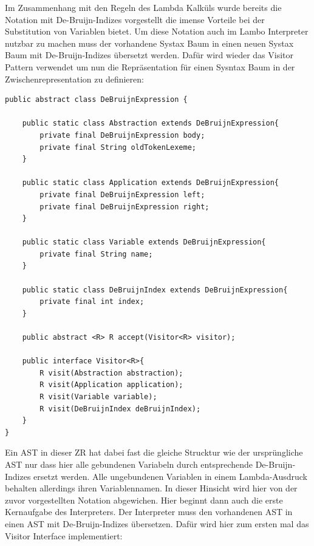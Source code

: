 \documentclass[ngerman]{article}
\begin{document}
Im Zusammenhang mit den Regeln des Lambda Kalküls wurde bereits die Notation mit De-Bruijn-Indizes vorgestellt die imense Vorteile bei der Substitution von Variablen bietet. Um diese Notation auch im Lambo Interpreter nutzbar zu machen muss der vorhandene Systax Baum in einen neuen Systax Baum mit De-Bruijn-Indizes übersetzt werden. Dafür wird wieder das Visitor Pattern verwendet um nun die Repräsentation für einen Sysntax Baum in der Zwischenrepresentation zu definieren:
\begin{lstlisting}[caption={TODO: Referenz zu Anhang}, captionpos=b]
public abstract class DeBruijnExpression {

    public static class Abstraction extends DeBruijnExpression{
        private final DeBruijnExpression body;
        private final String oldTokenLexeme;
    }

    public static class Application extends DeBruijnExpression{
        private final DeBruijnExpression left;
        private final DeBruijnExpression right;
    }

    public static class Variable extends DeBruijnExpression{
        private final String name;
    }

    public static class DeBruijnIndex extends DeBruijnExpression{
        private final int index;
    }

    public abstract <R> R accept(Visitor<R> visitor);

    public interface Visitor<R>{
        R visit(Abstraction abstraction);
        R visit(Application application);
        R visit(Variable variable);
        R visit(DeBruijnIndex deBruijnIndex);
    }
}
\end{lstlisting}
Ein AST in dieser ZR hat dabei fast die gleiche Strucktur wie der ursprüngliche AST nur dass hier alle gebundenen Variabeln durch entsprechende De-Bruijn-Indizes ersetzt werden. Alle ungebundenen Variablen in einem Lambda-Ausdruck behalten allerdings ihren Variablennamen. In dieser Hinsicht wird hier von der zuvor vorgestellten Notation abgewichen.
Hier beginnt dann auch die erste Kernaufgabe des Interpreters. Der Interpreter muss den vorhandenen AST in einen AST mit De-Bruijn-Indizes übersetzen. Dafür wird hier zum ersten mal das Visitor Interface implementiert:
\end{document}
